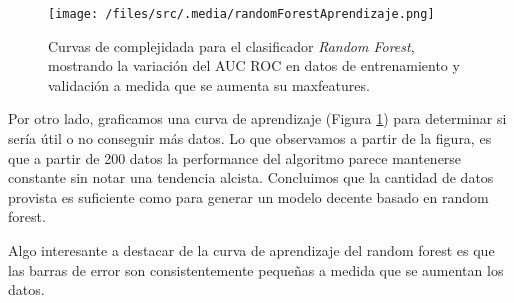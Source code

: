 \begin{figure}[!htbp]
    \centering
    \texttt{[image: /files/src/.media/randomForestAprendizaje.png]}
    \caption{Curvas de complejidada para el clasificador \textit{Random Forest}, mostrando la variación del AUC ROC en datos de entrenamiento y validación a medida que se aumenta su maxfeatures.}
    \label{RFLearning}
\end{figure}


Por otro lado, graficamos una curva de aprendizaje (Figura \ref{RFLearning}) para determinar si sería útil o no conseguir más datos. Lo que observamos a partir de la figura, es que a partir de 200 datos la performance del algoritmo parece mantenerse constante sin notar una tendencia alcista. Concluimos que la cantidad de datos provista es suficiente como para generar un modelo decente basado en random forest. 

Algo interesante a destacar de la curva de aprendizaje del random forest es que las barras de error son consistentemente pequeñas a medida que se aumentan los datos. 